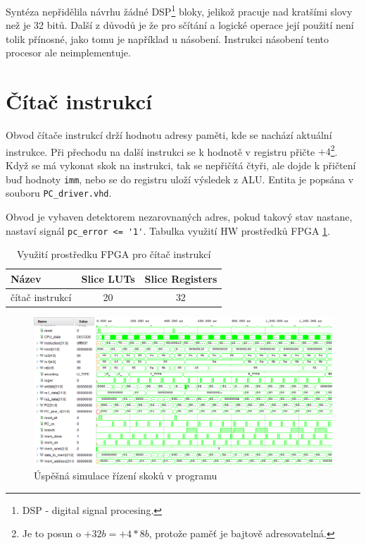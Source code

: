 \documentclass[FM,BP]{tulthesis}
\begin{document}
Syntéza nepřidělila návrhu žádné DSP\footnote{DSP - digital signal procesing.} bloky, jelikož pracuje nad kratšími slovy než je 32 bitů. Další z důvodů je že pro sčítání a logické operace její použití není tolik přínosné, jako tomu je například u násobení. Instrukci násobení tento procesor ale neimplementuje.

\section{Čítač instrukcí}
Obvod čítače instrukcí drží hodnotu adresy paměti, kde se nachází aktuální instrukce. Při přechodu na další instrukci se k hodnotě v registru přičte $+4$\footnote{Je to posun o $+32b = +4*8b$, protože paměť je bajtově adresovatelná.}. 
Když se má vykonat skok na instrukci, tak se nepřičítá čtyři, ale dojde k přičtení buď hodnoty \verb|imm|, nebo se do registru uloží výsledek z ALU. Entita je popsána v souboru \verb|PC_driver.vhd|.

Obvod je vybaven detektorem nezarovnaných adres, pokud takový stav nastane, nastaví signál \verb|pc_error <= '1'|. 
Tabulka využití HW prostředků FPGA \ref{table:PC_resources}.

\begin{table}[h]
    \caption{Využití prostředku FPGA pro čítač instrukcí}
    \label{table:PC_resources}
    \begin{center}
        \begin{tabular}{|l|c|c|}
        \hline
        \textbf{Název} & 
        \textbf{Slice LUTs} & 
        \textbf{Slice Registers} \\
        \hline
        čítač instrukcí & 20 & 32 \\
        \hline
        \end{tabular}
    \end{center}
\end{table}

\begin{figure}[h]
    \centering
    \includegraphics[width=\textwidth]{assets/PC_simulation.png}
    \caption{Úspěšná simulace řízení skoků v programu}
    \label{img:PC_simulace}
\end{figure}
\end{document}

